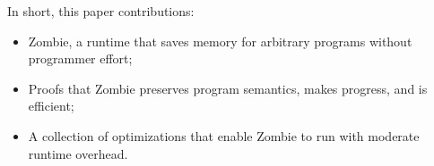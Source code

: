 In short, this paper contributions:
\begin{itemize}
\item Zombie, a runtime that saves memory
  for arbitrary programs without programmer effort;
\item Proofs that Zombie
  preserves program semantics, makes progress, and is efficient;
\item A collection of optimizations
  that enable Zombie to run with moderate runtime overhead.
\end{itemize}
